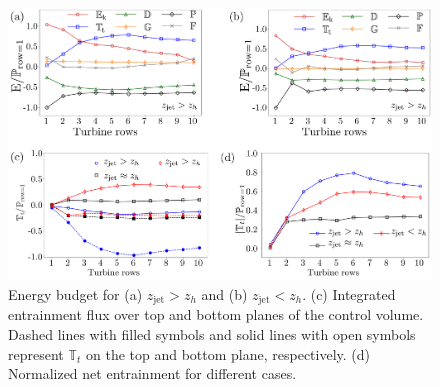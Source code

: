 \documentclass[%
 aip,
 amsmath,amssymb,
reprint,
twocolumn,%
author-numerical,%
]{revtex4-1}
\begin{document}
{{\begin{figure}[ht!]
	\centering
	\includegraphics[width=0.85\linewidth]{fig7}
	\caption{Energy budget for (a) $ z_\text{jet} > z_h$ and (b) $ z_\text{jet} < z_h$. (c) {\color{black} Integrated entrainment flux over top and bottom planes of the control volume. Dashed lines with filled symbols  and solid lines with open symbols represent $\mathbb{T}_t$ on the top and bottom plane, respectively.} (d) Normalized net entrainment for different cases.}
	\label{energybudget}
\end{figure}


}}
\end{document}
